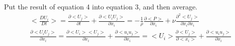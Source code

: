 Put the result of equation 4 into equation 3, and then average.
\begin{equation}
\begin{aligned}
<\frac{DU_{i}}{Dt}>=\frac{\partial <U_{j}>}{\partial t}+\frac{\partial <U_{i}U_{j}>}{\partial x_{i}}=-\frac{1}{\rho}\frac{\partial <P>}{\partial x_{i}}+\nu\frac{\partial^2 <U_{j}>}{\partial x_{i}\partial x_{i}}\\
\frac{\partial <U_{i}U_{j}>}{\partial x_{i}}=\frac{\partial <U_{i}><U_{j}>}{\partial x_{i}}+\frac{\partial <u_{i}u_{j}>}{\partial x_{i}}=<U_{i}>\frac{\partial <U_{j}>}{\partial <x_{i}>}+\frac{\partial <u_{i}u_{j}>}{\partial x_{i}}
\end{aligned}
\end{equation}










